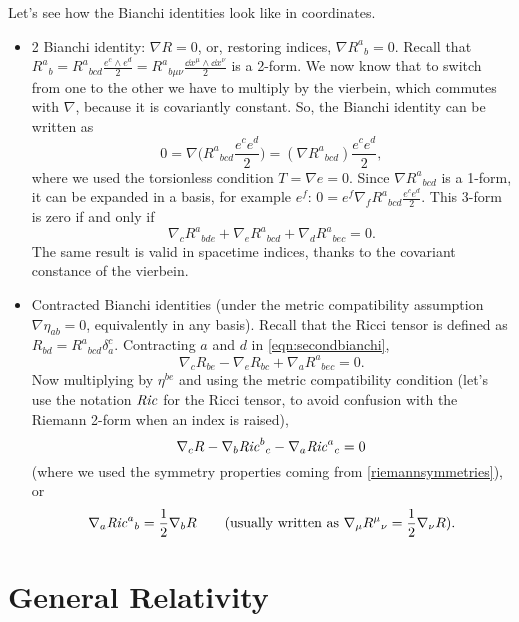 \documentclass[a4paper,12pt]{book}
\begin{document}
Let's see how the Bianchi identities look like in coordinates.
\begin{itemize}
\item 2 Bianchi identity: $\nabla R=0$, or, restoring indices, $\nabla R^a{}_b=0$. Recall that $R^a{}_b=R^a{}_{bcd}\frac{e^c\wedge e^d}{2}=R^a{}_{b\mu\nu}\frac{\dd x^\mu\wedge\dd x^\nu}{2}$ is a 2-form. We now know that to switch from one to the other we have to multiply by the vierbein, which commutes with $\nabla$, because it is covariantly constant. So, the Bianchi identity can be written as
\[0=\nabla\biggl(R^a{}_{bcd}\frac{e^ce^d}{2}\biggr)=(\nabla R^a{}_{bcd})\frac{e^ce^d}{2},\]
where we used the torsionless condition $T=\nabla e=0$. Since $\nabla R^a{}_{bcd}$ is a 1-form, it can be expanded in a basis, for example $e^f$: $0=e^f\nabla_fR^a{}_{bcd}\frac{e^ce^d}{2}$. This 3-form is zero if and only if
\begin{equation}
\nabla_c R^a{}_{bde}+\nabla_eR^a{}_{bcd}+\nabla_dR^a{}_{bec}=0.
\label{eqn:secondbianchi}
\end{equation}
The same result is valid in spacetime indices, thanks to the covariant constance of the vierbein.
\item Contracted Bianchi identities (under the metric compatibility assumption $\nabla\eta_{ab}=0$, equivalently in any basis). Recall that the Ricci tensor is defined as $R_{bd}=R^a{}_{bcd}\delta^c_a$. Contracting $a$ and $d$ in \cref{eqn:secondbianchi},
\[\nabla_cR_{be}-\nabla_eR_{bc}+\nabla_aR^a{}_{bec}=0.\]
Now multiplying by $\eta^{be}$ and using the metric compatibility condition (let's use the notation $\text{\emph{Ric}}$ for the Ricci tensor, to avoid confusion with the Riemann 2-form when an index is raised),
\[\nabla_cR-\nabla_b\text{\emph{Ric}}^b{}_c-\nabla_a\text{\emph{Ric}}^a{}_c=0\]
(where we used the symmetry properties coming from \cref{riemannsymmetries}), or
\[\nabla_a\text{\emph{Ric}}^a{}_b=\frac{1}{2}\nabla_bR\qquad(\text{usually written as } \nabla_\mu R^\mu{}_\nu=\frac{1}{2}\nabla_\nu R).\]
\end{itemize}



\chapter{General Relativity}
\end{document}
